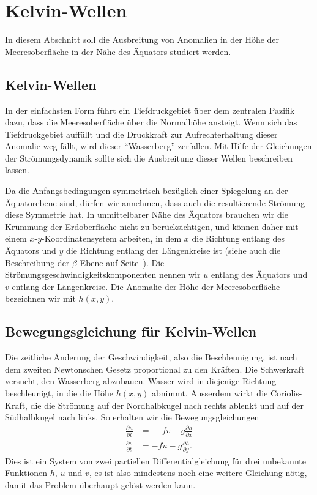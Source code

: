 %
%
%
\section{Kelvin-Wellen\label{section:elnino:kelvin}}
In diesem Abschnitt soll die Ausbreitung von Anomalien in der Höhe
der Meeresoberfläche in der Nähe des Äquators studiert werden.

\subsection{Kelvin-Wellen\label{subsection:kelvin}}
In der einfachsten Form führt ein Tiefdruckgebiet über dem zentralen
Pazifik dazu, dass die Meeresoberfläche über die Normalhöhe ansteigt.
Wenn sich das Tiefdruckgebiet auffüllt und die Druckkraft zur Aufrechterhaltung
dieser Anomalie weg fällt, wird dieser ``Wasserberg'' zerfallen.
Mit Hilfe der Gleichungen der Strömungsdynamik sollte sich die Ausbreitung
dieser Wellen beschreiben lassen.

Da die Anfangsbedingungen symmetrisch bezüglich einer Spiegelung an
der Äquatorebene sind, dürfen wir annehmen, dass auch die resultierende
Strömung diese Symmetrie hat.
In unmittelbarer Nähe des Äquators brauchen wir die Krümmung der
Erdoberfläche nicht zu berücksichtigen, und können daher mit einem
$x$-$y$-Koordinatensystem arbeiten, in dem $x$ die Richtung entlang des
Äquators und $y$ die Richtung entlang der Längenkreise ist (siehe auch
die Beschreibung der $\beta$-Ebene auf
Seite~\pageref{skript:betaplane:definition}).
%
Die Strömungsgeschwindigkeitskomponenten nennen wir $u$ entlang des
Äquators und $v$ entlang der Längenkreise.
Die Anomalie der Höhe der Meeresoberfläche bezeichnen wir mit $h(x,y)$.

\subsection{Bewegungsgleichung für Kelvin-Wellen}
Die zeitliche Änderung der Geschwindigkeit, also die Beschleunigung,
ist nach dem zweiten Newtonschen Gesetz proportional zu den Kräften.
Die Schwerkraft versucht, den Wasserberg abzubauen.
Wasser wird in diejenige Richtung beschleunigt, in die die Höhe $h(x,y)$
abnimmt.
Ausserdem wirkt die Coriolis-Kraft, die die Strömung auf der Nordhalbkugel
nach rechts ablenkt und auf der Südhalbkugel nach links.
So erhalten wir die Bewegungsgleichungen
\begin{equation}
\begin{aligned}
\frac{\partial u}{\partial t}
&=
\phantom{-}
fv - g\frac{\partial h}{\partial x}
\\
\frac{\partial v}{\partial t}
&=
-fu - g\frac{\partial h}{\partial y}.
\end{aligned}
\label{elnino:kelvin:newton}
\end{equation}
Dies ist ein System von zwei partiellen Differentialgleichung für 
drei unbekannte Funktionen $h$, $u$ und $v$, es ist also mindestens
noch eine weitere Gleichung nötig, damit das Problem überhaupt gelöst
werden kann.

